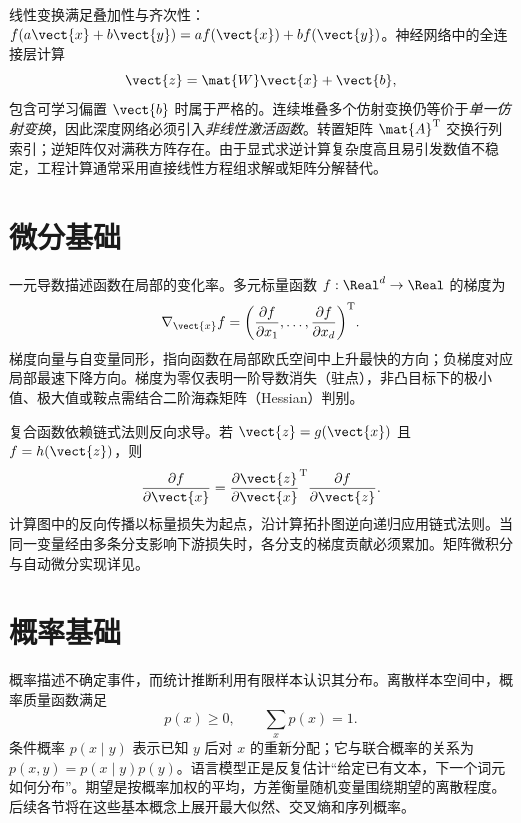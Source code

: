 \documentclass[../textbook.tex]{subfiles}
\begin{document}
线性变换满足叠加性与齐次性：$f(a\vect{x}+b\vect{y})=af(\vect{x})+bf(\vect{y})$。神经网络中的全连接层计算
\begin{equation}
 \vect{z}=\mat{W}\vect{x}+\vect{b},
\end{equation}
包含可学习偏置 $\vect{b}$ 时属于严格的。连续堆叠多个仿射变换仍等价于\emph{单一仿射变换}，因此深度网络必须引入\emph{非线性激活函数}。转置矩阵 $\mat{A}^{\mathrm{T}}$ 交换行列索引；逆矩阵仅对满秩方阵存在。由于显式求逆计算复杂度高且易引发数值不稳定，工程计算通常采用直接线性方程组求解或矩阵分解替代。

\section{微分基础}

一元导数描述函数在局部的变化率。多元标量函数 $f:\Real^d\to\Real$ 的梯度为
\begin{equation}
 \nabla_{\vect{x}} f={\left(
 \frac{\partial f}{\partial x_1},\ldots,
 \frac{\partial f}{\partial x_d}
 \right)}^{\mathrm{T}}.
\end{equation}
梯度向量与自变量同形，指向函数在局部欧氏空间中上升最快的方向；负梯度对应局部最速下降方向。梯度为零仅表明一阶导数消失（驻点），非凸目标下的极小值、极大值或鞍点需结合二阶海森矩阵（Hessian）判别。

复合函数依赖链式法则反向求导。若 $\vect{z}=g(\vect{x})$ 且 $f=h(\vect{z})$，则
\begin{equation}
 \frac{\partial f}{\partial \vect{x}}
 =\frac{\partial \vect{z}}{\partial \vect{x}}^{\mathrm{T}}
  \frac{\partial f}{\partial \vect{z}}.
\end{equation}
计算图中的反向传播以标量损失为起点，沿计算拓扑图逆向递归应用链式法则。当同一变量经由多条分支影响下游损失时，各分支的梯度贡献必须累加。矩阵微积分与自动微分实现详见。

\section{概率基础}

概率描述不确定事件，而统计推断利用有限样本认识其分布。离散样本空间中，概率质量函数满足
\begin{equation}
 p(x)\geq0,\qquad \sum_x p(x)=1.
\end{equation}
条件概率 $p(x\mid y)$ 表示已知 $y$ 后对 $x$ 的重新分配；它与联合概率的关系为
$p(x,y)=p(x\mid y)p(y)$。语言模型正是反复估计“给定已有文本，下一个词元如何分布”。期望是按概率加权的平均，方差衡量随机变量围绕期望的离散程度。后续各节将在这些基本概念上展开最大似然、交叉熵和序列概率。
\end{document}
